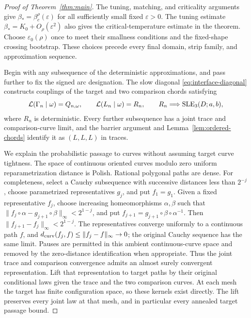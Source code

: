 \begin{proof}[Proof of Theorem~\ref{thm:main}]
The tuning, matching, and criticality arguments give
$\beta_* =\beta_c^\rho(\varepsilon)$ for all sufficiently small
fixed $\varepsilon>0$.  The tuning estimate
$\beta_*=K_0+O_\rho(\varepsilon^2)$ also gives the critical-temperature
estimate in the theorem.  Choose $\varepsilon_0(\rho)$ once to meet
their smallness conditions and the fixed-shape crossing bootstrap.
These choices precede every final domain, strip family, and
approximation sequence.

Begin with any subsequence of the deterministic approximations, and
pass further to fix the signed arc designation.  The slow diagonal
\eqref{eq:interface-diagonal} constructs couplings of the target and
two comparison chords satisfying
\[
 \mathcal L(\Gamma_n\mid\omega)=Q_{n,\omega},\qquad
 \mathcal L(L_n\mid\omega)=R_n,
 \qquad R_n\Longrightarrow\operatorname{SLE}_3(D;a,b),
\]
where $R_n$ is deterministic.  Every further subsequence has a joint
trace and comparison-curve limit, and the barrier argument and
Lemma~\ref{lem:ordered-chords} identify it as $(L,L,L)$ in traces.

We explain the probabilistic passage to curves without assuming
target curve tightness.  The space of continuous oriented curves
modulo zero uniform reparametrization distance is Polish.  Rational
polygonal paths are dense.  For completeness, select a Cauchy
subsequence with successive distances less than $2^{-j}$, choose
parametrized representatives $g_j$, and put $f_1=g_1$.  Given a
fixed representative $f_j$, choose increasing homeomorphisms
$\alpha,\beta$ such that
$\|f_j\circ\alpha-g_{j+1}\circ\beta\|_\infty<2^{1-j}$, and put
$f_{j+1}=g_{j+1}\circ\beta\circ\alpha^{-1}$.  Then
$\|f_{j+1}-f_j\|_\infty<2^{1-j}$.  The representatives converge
uniformly to a continuous path $f$, and
$d_{\rm curv}(f_j,f)\le\|f_j-f\|_\infty\to0$; the original
Cauchy sequence has the same limit.  Pauses are permitted in this
ambient continuous-curve space and removed by the zero-distance
identification when appropriate.  Thus the joint trace and comparison
convergence admits an almost surely convergent representation.
Lift that representation to target paths by their original
conditional laws given the trace and the two comparison curves.
At each mesh the target has finite configuration space, so these
kernels exist directly.  The lift preserves every joint law at
that mesh, and in particular every annealed target passage bound.


\end{proof}

